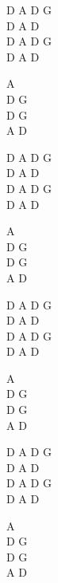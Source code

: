 \begin{chord}
    D A D G\\
    D A D\\
    D A D G\\
    D A D

    A\\
    D G\\
    D G\\
    A D

    D A D G\\
    D A D\\
    D A D G\\
    D A D

    A\\
    D G\\
    D G\\
    A D

    D A D G\\
    D A D\\
    D A D G\\
    D A D

    A\\
    D G\\
    D G\\
    A D

    D A D G\\
    D A D\\
    D A D G\\
    D A D

    A\\
    D G\\
    D G\\
    A D
\end{chord}